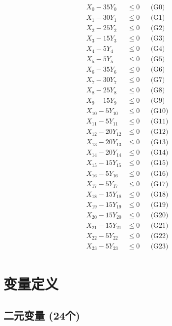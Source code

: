\documentclass[a4paper,10pt]{article}
\begin{document}
\allowdisplaybreaks
{\small
\begin{align}
X_{0} - 35Y_{0} &\leq 0 && \text{(G0)} \\
X_{1} - 30Y_{1} &\leq 0 && \text{(G1)} \\
X_{2} - 25Y_{2} &\leq 0 && \text{(G2)} \\
X_{3} - 15Y_{3} &\leq 0 && \text{(G3)} \\
X_{4} - 5Y_{4} &\leq 0 && \text{(G4)} \\
X_{5} - 5Y_{5} &\leq 0 && \text{(G5)} \\
X_{6} - 35Y_{6} &\leq 0 && \text{(G6)} \\
X_{7} - 30Y_{7} &\leq 0 && \text{(G7)} \\
X_{8} - 25Y_{8} &\leq 0 && \text{(G8)} \\
X_{9} - 15Y_{9} &\leq 0 && \text{(G9)} \\
\allowbreak
X_{10} - 5Y_{10} &\leq 0 && \text{(G10)} \\
X_{11} - 5Y_{11} &\leq 0 && \text{(G11)} \\
X_{12} - 20Y_{12} &\leq 0 && \text{(G12)} \\
X_{13} - 20Y_{13} &\leq 0 && \text{(G13)} \\
X_{14} - 20Y_{14} &\leq 0 && \text{(G14)} \\
X_{15} - 15Y_{15} &\leq 0 && \text{(G15)} \\
X_{16} - 5Y_{16} &\leq 0 && \text{(G16)} \\
X_{17} - 5Y_{17} &\leq 0 && \text{(G17)} \\
X_{18} - 15Y_{18} &\leq 0 && \text{(G18)} \\
X_{19} - 15Y_{19} &\leq 0 && \text{(G19)} \\
\allowbreak
X_{20} - 15Y_{20} &\leq 0 && \text{(G20)} \\
X_{21} - 15Y_{21} &\leq 0 && \text{(G21)} \\
X_{22} - 5Y_{22} &\leq 0 && \text{(G22)} \\
X_{23} - 5Y_{23} &\leq 0 && \text{(G23)} \\
\end{align}
}

\section{变量定义}

\subsection{二元变量 (24个)}
\end{document}
